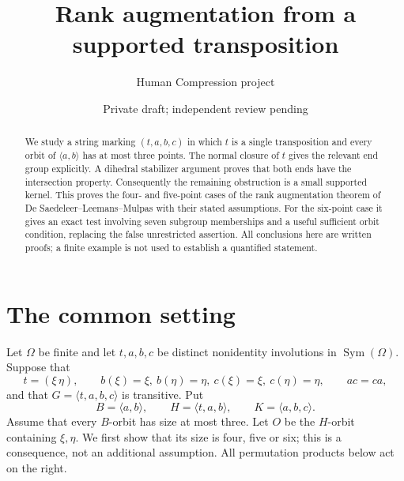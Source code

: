 \documentclass[a4paper,11pt]{article}
\title{Rank augmentation from a supported transposition}
\author{Human Compression project}\date{Private draft; independent review pending}
\newcommand{\gen}[1]{\langle#1\rangle}
\newcommand{\Sym}{\operatorname{Sym}}
\begin{document}
\maketitle
\begin{abstract}
We study a string marking $(t,a,b,c)$ in which $t$ is a single
transposition and every orbit of $\gen{a,b}$ has at most three points.
The normal closure of $t$ gives the relevant end group explicitly.
A dihedral stabilizer argument proves that both ends have the intersection
property. Consequently the remaining obstruction is a small supported
kernel. This proves the four- and five-point cases of the rank augmentation
theorem of De Saedeleer--Leemans--Mulpas with their stated assumptions.
For the six-point case it gives an exact test involving seven subgroup memberships and a useful
sufficient orbit condition, replacing the false unrestricted assertion.
All conclusions here are written proofs; a finite example is not used to
establish a quantified statement.
\end{abstract}

\section{The common setting}
Let $\Omega$ be finite and let $t,a,b,c$ be distinct nonidentity
involutions in $\Sym(\Omega)$. Suppose that
\[
 t=(\xi\,\eta),\qquad b(\xi)=\xi,\ b(\eta)=\eta,\ c(\xi)=\xi,\ c(\eta)=\eta,
 \qquad ac=ca,
\]
and that $G=\gen{t,a,b,c}$ is transitive. Put
\[
 B=\gen{a,b},\qquad H=\gen{t,a,b},\qquad K=\gen{a,b,c}.
\]
Assume that every $B$-orbit has size at most three. Let $O$ be the
$H$-orbit containing $\xi,\eta$. We first show that its size is four,
five or six; this is a consequence, not an additional assumption.
All permutation products below act on the right.
\end{document}
